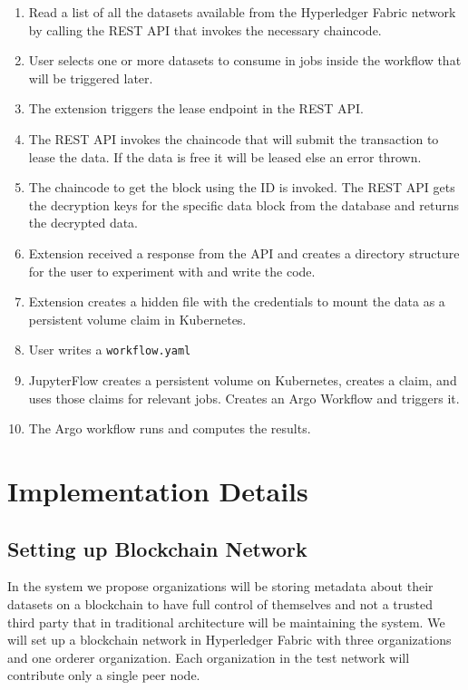 \begin{enumerate}
    \item Read a list of all the datasets available from the Hyperledger Fabric network by calling the REST API that invokes the necessary chaincode.
    \item User selects one or more datasets to consume in jobs inside the workflow that will be triggered later.
    \item The extension triggers the lease endpoint in the REST API.
    \item The REST API invokes the chaincode that will submit the transaction to lease the data. If the data is free it will be leased else an error thrown.
    \item The chaincode to get the block using the ID is invoked. The REST API gets the decryption keys for the specific data block from the database and returns the decrypted data.
    \item Extension received a response from the API and creates a directory structure for the user to experiment with and write the code.
    \item Extension creates a hidden file with the credentials to mount the data as a persistent volume claim in Kubernetes.
    \item User writes a \lstinline{workflow.yaml}
    \item JupyterFlow creates a persistent volume on Kubernetes, creates a claim, and uses those claims for relevant jobs. Creates an Argo Workflow and triggers it.
    \item The Argo workflow runs and computes the results.
\end{enumerate}

\section{Implementation Details}
\subsection{Setting up Blockchain Network}
In the system we propose organizations will be storing metadata about their datasets on a blockchain to have full control of themselves and not a trusted third party that in traditional architecture will be maintaining the system. We will set up a blockchain network in Hyperledger Fabric with three organizations and one orderer organization. Each organization in the test network will contribute only a single peer node.

